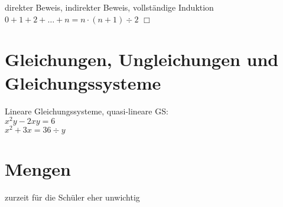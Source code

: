 \documentclass[a4paper]{article}
\theoremstyle{nonumberplain}
\begin{document}
direkter Beweis, indirekter Beweis, vollständige Induktion\\
$0+1+2+ \dots + n = n \cdot (n+1) \div 2$
$\Box$

\part{Gleichungen, Ungleichungen und Gleichungssysteme}

Lineare Gleichungssysteme, quasi-lineare GS:\\
$x^2 y - 2xy = 6$\\
$x^2 + 3 x = 36 \div y$

\part{Mengen}
zurzeit für die Schüler eher unwichtig
\end{document}

